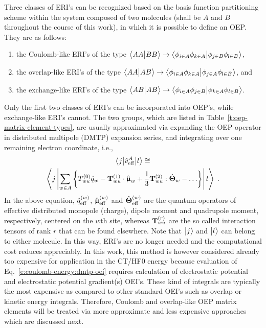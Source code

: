 \documentclass[aip,jcp,amsmath,amssymb,reprint,floatfix]{revtex4-1}
\begin{document}
Three classes of ERI's can be recognized 
based on the basis function partitioning scheme
within the system composed of two molecules (shall be $A$ and $B$
throughout the course of this work),
in which it is possible to define an OEP. 
They are as follows:
%
\begin{enumerate}
\item the Coulomb\hyp{}like ERI's of the type 
$\BraKet{AA}{BB}\rightarrow \BraKet{\phi_{i\in A}\phi_{k\in A}}{\phi_{j\in B}\phi_{l\in B}}$,
\item the overlap\hyp{}like ERI's of the type 
$\BraKet{AA}{AB}\rightarrow \BraKet{\phi_{i\in A}\phi_{k\in A}}{\phi_{j\in A}\phi_{l\in B}}$, and
\item the exchange\hyp{}like ERI's of the type 
$\BraKet{AB}{AB}\rightarrow \BraKet{\phi_{i\in A}\phi_{j\in B}}{\phi_{k\in A}\phi_{l\in B}}$.
\end{enumerate}
%
Only the first two classes of ERI's can be incorporated into OEP's,
while exchange\hyp{}like ERI's cannot.
The two groups, which are listed in Table~\ref{t:oep-matrix-element-types},
are usually approximated via
expanding the OEP operator in distributed multipole (DMTP) expansion series, and integrating over
one remaining electron coordinate,\cite{Li.Gordon.Jensen.JCP.2006} i.e.,
%
\begin{multline} \label{e:coulomb-energy:dmtp-oei}
 \tBraKet{j}{\hat{v}_{\rm eff}^A}{l} \cong \\
 \left< j \left| 
                   \sum_{w\in A} \left\{
                                 T^{(0)}_{wu} \hat{q}_w 
                          - {\bf T}^{(1)}_{wu} \cdot \hat{\BM\upmu}_w 
            + \frac{1}{3}   {\bf T}^{(2)}_{wu} :     \hat{\BM\Theta}_w 
                    - \ldots  \right\}
              \right| l \right> \;.
\end{multline}
%
In the above equation, $\hat{q}_{\rm eff}^{(w)}$,
$\hat{\BM\upmu}^{(w)}_{\rm eff}$ and $\hat{\BM\Theta}^{(w)}_{\rm eff}$
are the quantum operators of effective distributed monopole (charge),
dipole moment and quadrupole moment, respectively, centered on the $w$th site, 
whereas ${{\bf T}^{(r)}_{wu}}$ are the so called interaction tensors of rank $r$ 
that can be found elsewhere.\cite{Blasiak.Cho.JCP.2014}
Note that $\Ket{j}$ and $\Ket{l}$ can belong to either molecule.
In this way, ERI's are no longer needed and the computational cost reduces appreciably.
In this work, this method is however considered already too expensive
for application in the CT/HF0 energy because evaluation of
Eq.~\eqref{e:coulomb-energy:dmtp-oei} requires calculation
of electrostatic potential and electrostatic potential gradient(s) OEI's. These kind of
integrals are typically the most expensive as compared to other standard OEI's
such as overlap or kinetic energy integrals.
Therefore, Coulomb and overlap\hyp{}like OEP matrix elements
will be treated via more approximate and less expensive approaches
which are discussed next.
\end{document}
